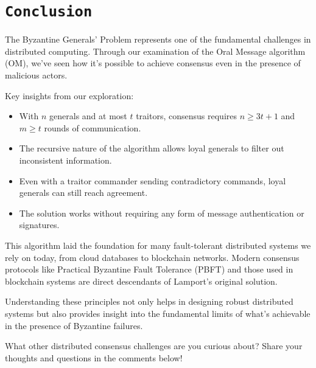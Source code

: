 \documentclass[11pt]{article}
\begin{document}
%

\section*{\texttt{\Large Conclusion}}

The Byzantine Generals' Problem represents one of the fundamental challenges in distributed computing. Through our examination of the Oral Message algorithm (OM), we've seen how it's possible to achieve consensus even in the presence of malicious actors.

Key insights from our exploration:

\begin{itemize}
    \item With $n$ generals and at most $t$ traitors, consensus requires $n \geq 3t+1$ and $m \geq t$ rounds of communication.
    \item The recursive nature of the algorithm allows loyal generals to filter out inconsistent information.
    \item Even with a traitor commander sending contradictory commands, loyal generals can still reach agreement.
    \item The solution works without requiring any form of message authentication or signatures.
\end{itemize}

This algorithm laid the foundation for many fault-tolerant distributed systems we rely on today, from cloud databases to blockchain networks. Modern consensus protocols like Practical Byzantine Fault Tolerance (PBFT) and those used in blockchain systems are direct descendants of Lamport's original solution.

Understanding these principles not only helps in designing robust distributed systems but also provides insight into the fundamental limits of what's achievable in the presence of Byzantine failures.

What other distributed consensus challenges are you curious about? Share your thoughts and questions in the comments below!
\end{document}
